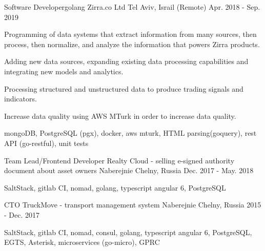 \begin{cventries}
  \cventry
    {Software Developer{\enskip\cdotp\enskip}golang} %
    {Zirra.co Ltd} %
    {Tel Aviv, Israil (Remote)} %
    {Apr. 2018 - Sep. 2019} %
    {
      \begin{cvitems} %
        \item {Programming of data systems that extract information from many sources, then process, then normalize, and analyze the information that powers Zirra products.}
        \item {Adding new data sources, expanding existing data processing capabilities and integrating new models and analytics.}
        \item {Processing structured and unstructured data to produce trading signals and indicators.}
        \item {Increase data quality using AWS MTurk in order to increase data quality.}
        \item {mongoDB, PostgreSQL (pgx), docker, aws mturk, HTML parsing(goquery), rest API (go-restful), unit tests}
      \end{cvitems}
    }

  \cventry
    {Team Lead/Frontend Developer} %
    {Realty Cloud - selling e-signed authority document about asset owners} %
    {Naberejnie Chelny, Russia} %
    {Dec. 2017 - May. 2018} %
    {
      \begin{cvitems} %
        \item {SaltStack, gitlab CI, nomad, golang, typescript angular 6, PostgreSQL}
      \end{cvitems}
    }

  \cventry
    {CTO} %
    {TruckMove - transport management system} %
    {Naberejnie Chelny, Russia} %
    {2015 - Dec. 2017} %
    {
      \begin{cvitems} %
        \item {SaltStack, gitlab CI, nomad, consul, golang, typescript angular 6, PostgreSQL, EGTS, Asterisk, microservices (go-micro), GPRC}
      \end{cvitems}
    }


\end{cventries}
